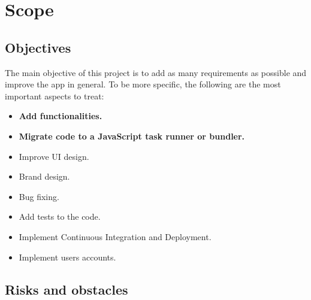 \section{Scope}
\label{sec:scope}

\subsection{Objectives}
\label{sec:objectives}
The main objective of this project is to add as many requirements as possible and improve the app in general. To be more specific, the following are the most important aspects to treat:
\begin{itemize}
    \item \textbf{Add functionalities.}
    \item \textbf{Migrate code to a JavaScript task runner or bundler.}
    \item Improve UI design.
    \item Brand design.
    \item Bug fixing.
    \item Add tests to the code.
    \item Implement Continuous Integration and Deployment.
    \item Implement users accounts.
\end{itemize}

\subsection{Risks and obstacles} \label{sec:risks}

